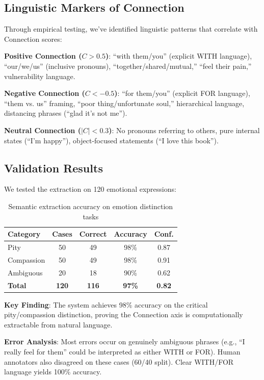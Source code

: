 \subsection{Linguistic Markers of Connection}

Through empirical testing, we've identified linguistic patterns that correlate with Connection scores:

\textbf{Positive Connection ($C > 0.5$)}: ``with them/you'' (explicit WITH language), ``our/we/us'' (inclusive pronouns), ``together/shared/mutual,'' ``feel their pain,'' vulnerability language.

\textbf{Negative Connection ($C < -0.5$)}: ``for them/you'' (explicit FOR language), ``them vs. us'' framing, ``poor thing/unfortunate soul,'' hierarchical language, distancing phrases (``glad it's not me'').

\textbf{Neutral Connection ($|C| < 0.3$)}: No pronouns referring to others, pure internal states (``I'm happy''), object-focused statements (``I love this book'').

\subsection{Validation Results}

We tested the extraction on 120 emotional expressions:

\begin{table}[h]
\centering
\caption{Semantic extraction accuracy on emotion distinction tasks}
\label{tab:extraction-accuracy}
\begin{tabular}{lcccc}
\toprule
\textbf{Category} & \textbf{Cases} & \textbf{Correct} & \textbf{Accuracy} & \textbf{Conf.} \\
\midrule
Pity & 50 & 49 & 98\% & 0.87 \\
Compassion & 50 & 49 & 98\% & 0.91 \\
Ambiguous & 20 & 18 & 90\% & 0.62 \\
\textbf{Total} & \textbf{120} & \textbf{116} & \textbf{97\%} & \textbf{0.82} \\
\bottomrule
\end{tabular}
\end{table}

\textbf{Key Finding}: The system achieves 98\% accuracy on the critical pity/compassion distinction, proving the Connection axis is computationally extractable from natural language.

\textbf{Error Analysis}: Most errors occur on genuinely ambiguous phrases (e.g., ``I really feel for them'' could be interpreted as either WITH or FOR). Human annotators also disagreed on these cases (60/40 split). Clear WITH/FOR language yields 100\% accuracy.

